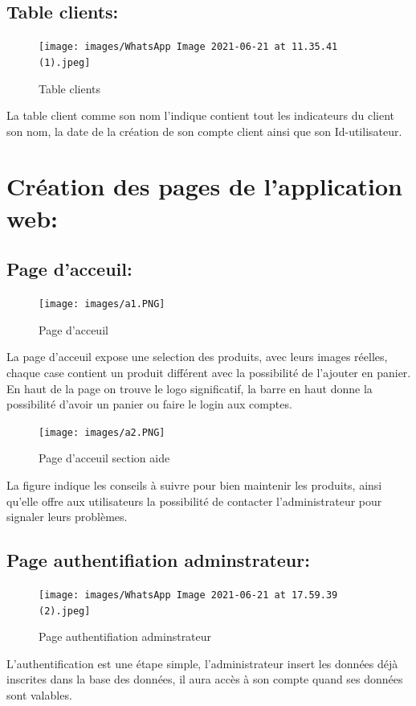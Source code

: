\documentclass[a4paper,12pt]{report}
\begin{document}
\begin{doublespace}
\begin{doublespace}
\begin{doublespace}
\begin{doublespace}
\begin{doublespace}
\begin{doublespace}
 \subsection{ Table clients: } 
\begin{figure}[H]

 \texttt{[image: images/WhatsApp Image 2021-06-21 at 11.35.41 (1).jpeg]}
 \caption{Table clients}
\end{figure}  
La table client comme son nom l'indique contient tout les indicateurs du client son nom, la date de la création de son compte client ainsi que son Id-utilisateur.  

\section{Création des pages de l'application web:}
\subsection{Page d'acceuil:}
\begin{figure}[H]
\begin{center}
 \texttt{[image: images/a1.PNG]}
 \caption{Page d'acceuil}
 \end{center}
\end{figure}  
\newpage
La page d'acceuil expose une selection des produits, avec leurs images réelles, chaque case contient un produit différent avec la possibilité de l'ajouter en panier. En haut de la page on trouve le logo significatif, la barre en haut donne la possibilité d'avoir un panier ou faire le login aux comptes. 
\begin{figure}[H]
\begin{center}
 \texttt{[image: images/a2.PNG]}
 \caption{Page d'acceuil section aide }
 \end{center}
\end{figure} 
La figure indique les conseils à suivre pour bien maintenir les produits, ainsi qu'elle offre aux utilisateurs la possibilité de contacter l'administrateur pour signaler leurs problèmes.
\subsection{Page authentifiation adminstrateur:}
\begin{figure}[H]
\begin{center}
 \texttt{[image: images/WhatsApp Image 2021-06-21 at 17.59.39 (2).jpeg]}
 \caption{Page authentifiation adminstrateur}
 \end{center}
\end{figure} 
L’authentification est une étape simple, l'administrateur insert les données déjà inscrites dans la base des données, il aura accès à son compte quand ses données sont valables.

\end{doublespace}
\end{doublespace}
\end{doublespace}
\end{doublespace}
\end{doublespace}
\end{doublespace}
\end{document}
